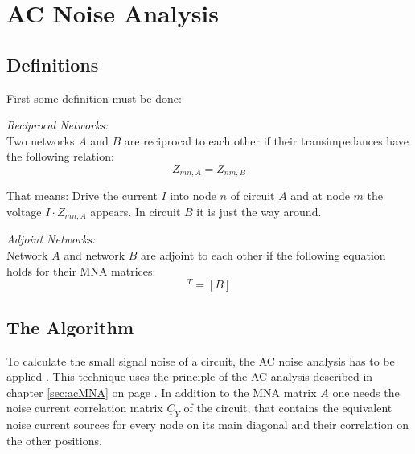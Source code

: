 %
%
%
%

\chapter{AC Noise Analysis}

\section{Definitions}

First some definition must be done:

\addvspace{12pt}

\emph{Reciprocal Networks:}\\
Two networks $A$ and $B$ are reciprocal to each other if their
transimpedances have the following relation:
\begin{equation}
Z_{mn,A} = Z_{nm,B}
\end{equation}

That means: Drive the current $I$ into node $n$ of circuit $A$ and
at node $m$ the voltage $I\cdot Z_{mn,A}$ appears. In circuit $B$
it is just the way around.

\addvspace{12pt}

\emph{Adjoint Networks:}\\
Network $A$ and network $B$ are adjoint to each other if the following
equation holds for their MNA matrices:
\begin{equation}
[A]^T = [B]
\end{equation}

\section{The Algorithm}

To calculate the small signal noise of a circuit, the AC noise
analysis has to be applied \cite{Blum}.  This technique uses the
principle of the AC analysis described in chapter \ref{sec:acMNA} on
page \pageref{sec:acMNA}.  In addition to the MNA matrix $A$ one needs
the noise current correlation matrix $\underline{C}_Y$ of the circuit,
that contains the equivalent noise current sources for every node on
its main diagonal and their correlation on the other positions.

